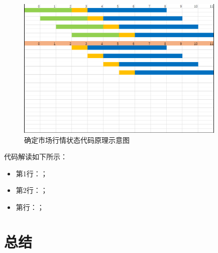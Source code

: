 \begin{figure}[H]
    \caption{确定市场行情状态代码原理示意图}
    \label{f000005}
    \centering
    \includegraphics[width=10cm]{images/f000005}
\end{figure}
代码解读如下所示：
\begin{itemize}
    \item 第1行：；
    \item 第2行：；
    \item 第行：；
\end{itemize}

\section{总结}